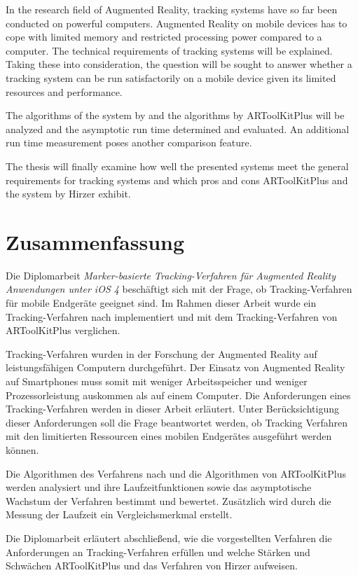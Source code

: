 In the research field of Augmented Reality, tracking systems have so far been conducted on powerful computers.
 Augmented Reality on mobile devices has to cope with limited memory and restricted processing power compared to a
 computer. The technical requirements of tracking systems will be explained. Taking these into consideration, the
 question will be sought to answer whether a tracking system can be run satisfactorily on a mobile device given its
 limited resources and performance.

The algorithms of the system by \citeauthor{hirzer08} and the algorithms by ARToolKitPlus will be analyzed and the
 asymptotic run time determined and evaluated. An additional run time measurement poses another comparison feature.

The thesis will finally examine how well the presented systems meet the general requirements for tracking systems and
 which pros and cons ARToolKitPlus and the system by Hirzer exhibit.

\chapter*{Zusammenfassung} %
\label{cha:abstract-deu}
Die Diplomarbeit \emph{Marker-basierte Tracking-Verfahren für Augmented Reality Anwendungen unter iOS 4} beschäftigt
sich mit der Frage, ob Tracking-Verfahren für mobile Endgeräte geeignet sind. Im Rahmen dieser Arbeit wurde ein
Tracking-Verfahren nach \citeauthor{hirzer08} implementiert und mit dem Tracking-Verfahren von ARToolKitPlus
 verglichen.

Tracking-Verfahren wurden in der Forschung der Augmented Reality auf leistungsfähigen Computern durchgeführt. Der
Einsatz von Augmented Reality auf Smartphones muss somit mit weniger Arbeitsspeicher und weniger Prozessorleistung
auskommen als auf einem Computer. Die Anforderungen eines Tracking-Verfahren werden in dieser Arbeit erläutert. Unter
 Berücksichtigung dieser Anforderungen soll die Frage beantwortet werden, ob Tracking Verfahren mit den limitierten
 Ressourcen eines mobilen Endgerätes ausgeführt werden können.

Die Algorithmen des Verfahrens nach \citeauthor{hirzer08} und die Algorithmen von ARToolKitPlus werden analysiert und
 ihre Laufzeitfunktionen sowie das asymptotische Wachstum der Verfahren bestimmt und bewertet. Zusätzlich wird durch
 die Messung der Laufzeit ein Vergleichsmerkmal erstellt.

Die Diplomarbeit erläutert abschließend, wie die vorgestellten Verfahren die Anforderungen an Tracking-Verfahren
erfüllen und welche Stärken und Schwächen ARToolKitPlus und das Verfahren von Hirzer aufweisen.

